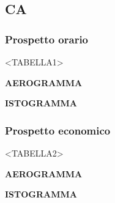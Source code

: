 \subsection{CA}

\subsubsection{Prospetto orario}

<TABELLA1>


\textbf{AEROGRAMMA}


\textbf{ISTOGRAMMA}

\subsubsection{Prospetto economico}

<TABELLA2>


\textbf{AEROGRAMMA}


\textbf{ISTOGRAMMA}

